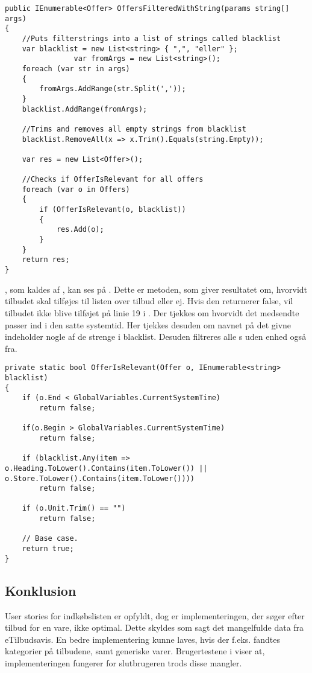 \begin{lstlisting}[caption={\class{OffersFilteredByUserPref} er metoden, der filtrerer \class{Offers} på baggrund af uønskede strenge.}, label=OffersFilteredByUserPrefs] 
public IEnumerable<Offer> OffersFilteredWithString(params string[] args)
{
	//Puts filterstrings into a list of strings called blacklist
    var blacklist = new List<string> { ",", "eller" };
                var fromArgs = new List<string>();
    foreach (var str in args)
    {
        fromArgs.AddRange(str.Split(','));
    }
    blacklist.AddRange(fromArgs);
    
    //Trims and removes all empty strings from blacklist
    blacklist.RemoveAll(x => x.Trim().Equals(string.Empty));

    var res = new List<Offer>();

	//Checks if OfferIsRelevant for all offers
    foreach (var o in Offers)
    {
        if (OfferIsRelevant(o, blacklist))
        {
            res.Add(o);
        }
    }
    return res;
}
\end{lstlisting}

, som kaldes af , kan ses på . 
Dette er metoden, som giver resultatet om, hvorvidt tilbudet skal tilføjes til listen over tilbud eller ej. 
Hvis den returnerer false, vil tilbudet ikke blive tilføjet på linie 19 i .
Der tjekkes om hvorvidt det medsendte  passer ind i den satte systemtid.
Her tjekkes desuden om navnet på det givne  indeholder nogle af de strenge i blacklist.
Desuden filtreres alle s uden enhed også fra.

\begin{lstlisting}[caption={\class{OffersFilteredByUserPrefs}, sørger for at tilbudet som modtages som input overholder de forskellige krav sat i blacklisten.}, label=OfferIsRelevant]
private static bool OfferIsRelevant(Offer o, IEnumerable<string> blacklist)
{
    if (o.End < GlobalVariables.CurrentSystemTime)
        return false;

    if(o.Begin > GlobalVariables.CurrentSystemTime)
        return false;

    if (blacklist.Any(item => o.Heading.ToLower().Contains(item.ToLower()) || o.Store.ToLower().Contains(item.ToLower())))
        return false;

    if (o.Unit.Trim() == "")
        return false;

    // Base case.
    return true;
}
\end{lstlisting}

\subsection{Konklusion}
User stories for indkøbslisten er opfyldt, dog er implementeringen, der søger efter tilbud for en vare, ikke optimal.
Dette skyldes som sagt det mangelfulde data fra eTilbudsavis.
En bedre implementering kunne laves, hvis der f.eks. fandtes kategorier på tilbudene, samt generiske varer.
Brugertestene i  viser at, implementeringen fungerer for slutbrugeren trods disse mangler.
